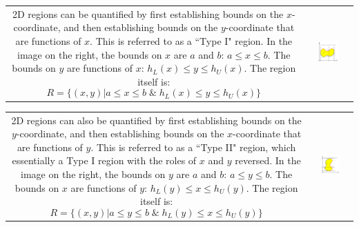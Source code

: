 \documentclass{article}
\begin{document}
\begin{tabular}{cc}  
\parbox{0.5\textwidth}{
2D regions can be quantified by first establishing bounds on the \(x\)-coordinate, and then establishing bounds on the \(y\)-coordinate that are functions of \(x\). This is referred to as a ``Type I" region. In the image on the right, the bounds on \(x\) are \(a\) and \(b\): \(a \leq x \leq b\). The bounds on \(y\) are functions of \(x\): \(h_L(x) \leq y \leq h_U(x)\). The region itself is:
\[R = \{(x,y) | a \leq x \leq b \;\&\; h_L(x) \leq y \leq h_U(x)\}\]
} & \parbox{0.5\textwidth}{
\includegraphics[width = 0.5\textwidth]{Cartesian_Regions_Type_I}
}
\end{tabular}

\begin{tabular}{cc}  
\parbox{0.5\textwidth}{
2D regions can also be quantified by first establishing bounds on the \(y\)-coordinate, and then establishing bounds on the \(x\)-coordinate that are functions of \(y\). This is referred to as a ``Type II" region, which essentially a Type I region with the roles of \(x\) and \(y\) reversed. In the image on the right, the bounds on \(y\) are \(a\) and \(b\): \(a \leq y \leq b\). The bounds on \(x\) are functions of \(y\): \(h_L(y) \leq x \leq h_U(y)\). The region itself is:
\[R = \{(x,y) | a \leq y \leq b \;\&\; h_L(y) \leq x \leq h_U(y)\}\]
} & \parbox{0.5\textwidth}{
\includegraphics[width = 0.5\textwidth]{Cartesian_Regions_Type_II}
}
\end{tabular}
\end{document}
